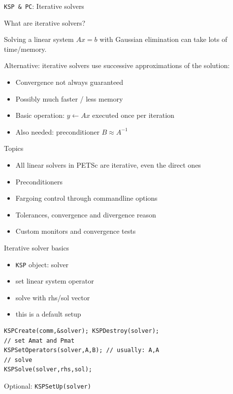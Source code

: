 
 {\texttt{KSP \& PC}: Iterative solvers}

\begin{numberedframe}{What are iterative solvers?}

Solving a linear system $Ax=b$ with Gaussian elimination can take lots
of time/memory.

Alternative: iterative solvers use successive approximations of the
solution:
\begin{itemize}
\item Convergence not always guaranteed
\item Possibly much faster / less memory
\item Basic operation: $y\leftarrow Ax$ executed once per iteration
\item Also needed: preconditioner $B\approx A^{-1}$
\end{itemize}
\end{numberedframe}

\begin{longstory}
\begin{numberedframe}{Topics}
  \begin{itemize}
  \item All linear solvers in PETSc are iterative, even the direct ones
  \item Preconditioners
  \item Fargoing control through commandline options
  \item Tolerances, convergence and divergence reason
  \item Custom monitors and convergence tests
  \end{itemize}
\end{numberedframe}
\end{longstory}


\begin{numberedframe}{Iterative solver basics}
  \begin{itemize}
  \item \lstinline{KSP} object: solver
  \item set linear system operator
  \item solve with rhs/sol vector
  \item this is a default setup
  \end{itemize}

\begin{lstlisting}
KSPCreate(comm,&solver); KSPDestroy(solver);
// set Amat and Pmat
KSPSetOperators(solver,A,B); // usually: A,A
// solve
KSPSolve(solver,rhs,sol);
\end{lstlisting}
Optional: \lstinline{KSPSetUp(solver)}
\end{numberedframe}

